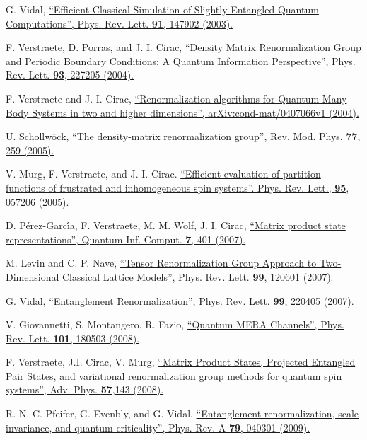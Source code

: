 \documentclass[a4paper,preprintnumbers,nofootinbib,twocolumn]{quantumarticle}
\begin{document}
\begin{thebibliography}{99}
 G. Vidal,
\href{https://doi.org/10.1103/PhysRevLett.91.147902}{
``Efficient Classical Simulation of Slightly Entangled Quantum Computations'',
Phys. Rev. Lett. {\bf 91}, 147902 (2003).
}

 F. Verstraete, D. Porras, and J. I. Cirac,
\href{https://doi.org/10.1103/PhysRevLett.93.227205}{
``Density Matrix Renormalization Group and Periodic Boundary Conditions: A Quantum Information Perspective'',
Phys. Rev. Lett. {\bf 93}, 227205 (2004).
}

F. Verstraete and J. I. Cirac,
\href{https://arxiv.org/abs/cond-mat/0407066}{
``Renormalization algorithms for Quantum-Many Body Systems in two and higher dimensions'',
arXiv:cond-mat/0407066v1 (2004).
}

  U. Schollw\"{o}ck,
\href{https://doi.org/10.1103/RevModPhys.77.259}{
``The density-matrix renormalization group'',
Rev. Mod. Phys. {\bf 77}, 259 (2005).
}

  V. Murg, F. Verstraete, and J. I. Cirac.
\href{https://doi.org/10.1103/PhysRevLett.95.057206}{
``Efficient evaluation of partition functions of frustrated and inhomogeneous spin systems''.
Phys. Rev. Lett., {\bf 95}, 057206  (2005).
}

  D.  P\'erez-Garc\'{\i}a, F.  Verstraete, M. M.  Wolf, J. I.  Cirac,
\href{https://dl.acm.org/doi/10.5555/2011832.2011833}{
``Matrix product state representations'',
Quantum Inf. Comput. {\bf 7}, 401 (2007).
}

 M. Levin and C. P. Nave,
\href{https://doi.org/10.1103/PhysRevLett.99.120601}{
``Tensor Renormalization Group Approach to Two-Dimensional Classical Lattice Models'',
Phys. Rev. Lett. {\bf 99}, 120601 (2007).
}

 G. Vidal,
\href{https://doi.org/10.1103/PhysRevLett.99.220405}{
``Entanglement Renormalization'',
Phys. Rev. Lett. {\bf 99}, 220405 (2007).
}

  V.  Giovannetti, S.  Montangero, R.  Fazio,
\href{https://doi.org/10.1103/PhysRevLett.101.180503}{
``Quantum MERA Channels'',
Phys. Rev. Lett. {\bf 101}, 180503 (2008).
}

 F. Verstraete, J.I. Cirac, V. Murg,
\href{https://doi.org/10.1080/14789940801912366}{
``Matrix Product States, Projected Entangled Pair States, and variational renormalization group methods for quantum spin systems'',
Adv. Phys. {\bf 57},143 (2008). 
}

 R. N. C. Pfeifer, G. Evenbly, and G. Vidal,
\href{https://doi.org/10.1103/PhysRevA.79.040301}{
``Entanglement renormalization, scale invariance, and quantum criticality'',
Phys. Rev. A {\bf 79}, 040301 (2009).
}


\end{thebibliography}
\end{document}
